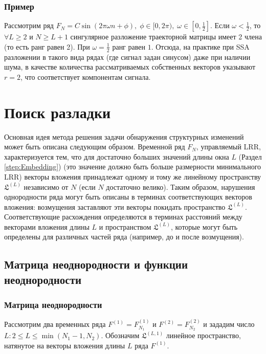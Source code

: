 \documentclass[specialist, substylefile = spbu.rtx,
			   subf, href, 12pt]{disser}
\begin{document}
\subsection{Пример}

Рассмотрим ряд $F_N = C\sin(2\pi\omega n + \phi),\;\phi \in [0, 2\pi), \; \omega \in [0, \frac{1}{2}]$. Если $\omega < \frac{1}{2}$, то $\forall L\geq 2$ и $N\geq L+1$ сингулярное разложение траекторной матрицы имеет 2 члена (то есть ранг равен 2). При $\omega=\frac{1}{2}$ ранг равен $1$. Отсюда, на практике при SSA разложении в такого вида рядах (где сигнал задан синусом) даже при наличии шума, в качестве количества рассматриваемых собственных векторов указывают $r=2$, что соответствует компонентам сигнала.

\chapter{Поиск разладки} \label{sec:ch_2}
Основная идея метода решения задачи обнаружения структурных изменений может быть описана следующим образом. Временной ряд $F_N$, управляемый LRR, характеризуется тем, что для достаточно больших значений длины окна $L$ (Раздел \ref{step:Embedding}) (это значение должно быть больше размерности минимального LRR) векторы вложения принадлежат одному и тому же линейному пространству $\mathfrak{L}^{(L)}$ независимо от $N$ (если $N$ достаточно велико). Таким образом, нарушения однородности ряда могут быть описаны в терминах соответствующих векторов вложения: возмущения заставляют эти векторы покидать пространство $\mathfrak{L}^{(L)}$. Соответствующие расхождения определяются в терминах расстояний между векторами вложения длины $ L $ и пространством $\mathfrak{L}^{(L)}$, которые могут быть определены для различных частей ряда (например, до и после возмущения).

\section{Матрица неоднородности и функции неоднородности}
\subsection{Матрица неоднородности}

Рассмотрим два временных ряда $F^{(1)} = F_{N_1}^{(1)}$ и $F^{(2)} = F_{N_2}^{(2)}$ и зададим число $L: 2 \leq L \leq \min(N_1 - 1, N_2)$. Обозначим $\mathfrak{L}^{(L, 1)}$ линейное пространство, натянутое на векторы вложения длины $ L $ ряда $F^{(1)}$.
\end{document}

